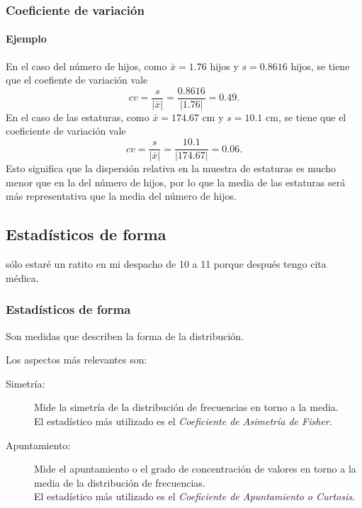 \begin{frame}
\frametitle{Coeficiente de variación}
\framesubtitle{Ejemplo}
En el caso del número de hijos, como $\bar x=1.76$ hijos y $s=0.8616$ hijos, se tiene que el coefiente de variación vale
\[
cv = \frac{s}{|\bar x|} = \frac{0.8616}{|1.76|} = 0.49.
\]
En el caso de las estaturas, como $\bar x=174.67$ cm y $s=10.1$ cm, se tiene que el coeficiente de variación vale
\[
cv = \frac{s}{|\bar x|} = \frac{10.1}{|174.67|} = 0.06.
\]
Esto significa que la dispersión relativa en la muestra de estaturas es mucho menor que en la del número de hijos, por
lo que la media de las estaturas será más representativa que la media del número de hijos. 
\end{frame}


\subsection{Estadísticos de forma}sólo estaré un ratito en mi despacho de 10 a 11 porque después tengo cita médica. 
\begin{frame}
\frametitle{Estadísticos de forma}
Son medidas que describen la forma de la distribución.

Los aspectos más relevantes son:
\begin{description}
\item[Simetría:] Mide la simetría de la distribución de frecuencias en torno a la media.\\
El estadístico más utilizado es el \emph{Coeficiente de Asimetría de Fisher}.
\item[Apuntamiento:] Mide el apuntamiento o el grado de concentración de valores en torno a la media de la distribución de frecuencias.\\
El estadístico más utilizado es el \emph{Coeficiente de Apuntamiento o Curtosis}.
\end{description}
\end{frame}


